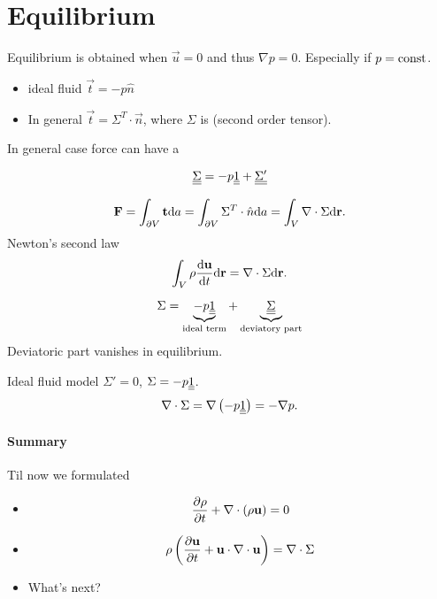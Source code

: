 \documentclass[11pt,oneside]{book}
\theoremstyle{definition} %
\theoremstyle{plain} %
\theoremstyle{remark} %
\theoremstyle{underline}
\begin{document}
  \section{Equilibrium}
  Equilibrium is obtained when $\vec u = 0$ and thus $\nabla p = 0$.
  Especially if $p = \textrm{const}$.
  \begin{itemize}
    \item ideal fluid $ \vec t = - p \hat n$
    \item In general $ \vec t = \Sigma^T \cdot \vec n$, where $\Sigma$ is  (second order tensor).
  \end{itemize}
  In general case force can have a 
  
  \begin{displaymath}
    \ul{\ul{\Sigma}} = - p \ul{\ul{1}} + \ul{\ul{\Sigma'}} %
  \end{displaymath}


  \begin{displaymath}
    \mathbf{F} = \int_{\partial V} \mathbf{t} \mathrm{d} a = \int_{\partial V} \Sigma^T \cdot \hat n \mathrm{d} a = \int_V \nabla \cdot \Sigma \mathrm{d} \mathbf{r}.
  \end{displaymath}
  Newton's second law
  \begin{displaymath}
    \int_V \rho \frac{\mathrm{d} \mathbf{u}}{\mathrm{d} t} \mathrm{d} \mathbf{r} = \nabla \cdot \Sigma \mathrm{d} \mathbf{r}.
  \end{displaymath}

  \begin{displaymath}
    \Sigma = \underbrace{- p \underline{\underline{1}}}_{\textrm{ideal term}} + \underbrace{\underline{\underline{\Sigma}}}_{\textrm{deviatory part}}
  \end{displaymath}
  Deviatoric part vanishes in equilibrium.

  Ideal fluid model $\Sigma' = 0$, $\Sigma = - p \underline{\underline{1}}$.
  \begin{displaymath}
    \nabla \cdot \Sigma = \nabla \left( - p \underline{\underline{1}} \right) = - \nabla p.
  \end{displaymath}

  \paragraph{Summary}
  Til now we formulated
  
  \begin{itemize}
    \item 
      \begin{displaymath}
          \frac{\partial \rho}{\partial t} + \nabla \cdot ( \rho \mathbf{u} ) = 0
      \end{displaymath}
    \item \begin{displaymath}
        \rho \left( \frac{\partial \mathbf{u} }{\partial t} + \mathbf{u} \cdot \nabla \cdot \mathbf{u}  \right) = \nabla \cdot \Sigma
    \end{displaymath}
  \item What's next?
  \end{itemize}
\end{document}
